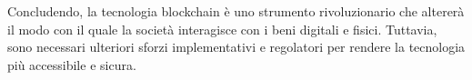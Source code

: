 Concludendo, la tecnologia blockchain è uno strumento rivoluzionario che altererà il modo con il quale la società interagisce con i beni digitali e fisici. Tuttavia, sono necessari ulteriori sforzi implementativi e regolatori per rendere la tecnologia più accessibile e sicura.












